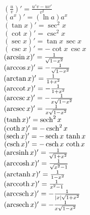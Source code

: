 \def\sinh{\mathop{\rm sinh}\nolimits}
\def\cosh{\mathop{\rm cosh}\nolimits}
\def\sech{\mathop{\rm sech}\nolimits}
\def\csch{\mathop{\rm csch}\nolimits}
\def\coth{\mathop{\rm coth}\nolimits}
\def\tanh{\mathop{\rm tanh}\nolimits}

\def\arccot{\mathop{\rm arccot}\nolimits}
\def\arcsec{\mathop{\rm arcsec}\nolimits}
\def\arccsc{\mathop{\rm arccsc}\nolimits}
\def\arcsinh{\mathop{\rm arcsinh}\nolimits}
\def\arccosh{\mathop{\rm arccosh}\nolimits}
\def\arctanh{\mathop{\rm arctanh}\nolimits}
\def\arccoth{\mathop{\rm arccoth}\nolimits}
\def\arcsech{\mathop{\rm arcsech}\nolimits}
\def\arccsch{\mathop{\rm arccsch}\nolimits}
\begin{small}
\begin{flushleft}
\begin{multicols}{2}
	$ (\frac{u}{v})' = \frac{u'v - uv'}{v^2} $ \\
	$ (a^x)' = (\ln a) a^x $ \\
	$ (\tan x)' = \sec^2 x $ \\
	$ (\cot x)' = \csc^2 x $ \\
	$ (\sec x)' = \tan x\, \sec x $ \\
	$ (\csc x)' = - \cot x\, \csc x $ \\
	$ (\arcsin x)' = {1 \over \sqrt{1-x^2}} $ \\
	$ (\arccos x)' = -{1 \over \sqrt{1-x^2}} $ \\
	$ (\arctan x)' = {1 \over 1+x^2} $ \\
	$ (\arccot x)' = -{1 \over 1+x^2} $ \\
	$ (\arccsc x)' = -{1 \over x \sqrt{1-x^2}} $ \\
	$ (\arcsec x)' = {1 \over x \sqrt{1-x^2}} $ \\
	$ (\tanh x)' = \sech^2 x $ \\
	$ (\coth x)' = -\csch^2 x $ \\
	$ (\sech x)' = -\sech x \, \tanh x $ \\
	$ (\csch x)' = -\csch x \, \coth x $ \\
	$ (\arcsinh x)' = {1 \over \sqrt{1+x^2}} $ \\
	$ (\arccosh x)' = {1 \over \sqrt{x^2-1}} $ \\
	$ (\arctanh x)' = {1 \over 1-x^2} $ \\
	$ (\arccoth x)' = {1 \over x^2-1} $ \\
	$ (\arccsch x)' = -{1 \over \vert x \vert \sqrt{1+x^2}} $ \\
	$ (\arcsech x)' = -{1 \over x \sqrt{1-x^2}} $ \\
\end{multicols}
\end{flushleft}
\end{small}

